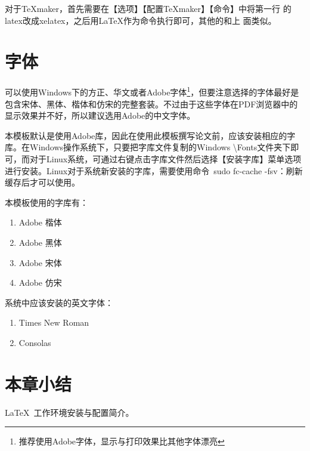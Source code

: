 对于\TeX{}maker，首先需要在【选项】【配置\TeX{}maker】【命令】中将第一行
的latex改成xelatex，之后用\LaTeX{}作为\XeLaTeX{}命令执行即可，其他的和上
面类似。

\section{字体}

可以使用Windows下的方正、华文或者Adobe字体\footnote{推荐使用Adobe字体，显示与打印效果比其他字体漂亮}，但要注意选择的字体最好是包含宋体、黑体、楷体和仿宋的完整套装。不过由于这些字体在PDF浏览器中的显示效果并不好，所以建议选用Adobe的中文字体。

本模板默认是使用Adobe库，因此在使用此模板撰写论文前，应该安装相应的字库。在Windows操作系统下，只要把字库文件复制的Windows \textbackslash Fonts文件夹下即可，而对于Linux系统，可通过右键点击字库文件然后选择【安装字库】菜单选项进行安装。Linux对于系统新安装的字库，需要使用命令~sudo fc-cache -fsv：刷新缓存后才可以使用。

本模板使用的字库有：

\begin{enumerate}
\item Adobe 楷体
\item Adobe 黑体
\item Adobe 宋体
\item Adobe 仿宋
\end{enumerate}

系统中应该安装的英文字体：
\begin{enumerate}
\item Times New Roman
\item Consolas
\end{enumerate}


\section*{本章小结}
\LaTeX{}~工作环境安装与配置简介。